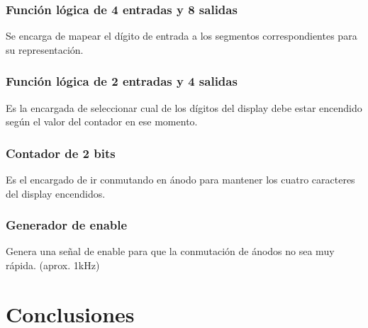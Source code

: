 \documentclass[a4paper,10pt]{article}
\begin{document}
		\subsubsection{Función lógica de 4 entradas y 8 salidas}
		Se encarga de mapear el dígito de entrada a los segmentos correspondientes para su representación.
		\subsubsection{Función lógica de 2 entradas y 4 salidas}
		Es la encargada de seleccionar cual de los dígitos del display debe estar encendido según el valor del contador en ese momento.
		\subsubsection{Contador de 2 bits}
		Es el encargado de ir conmutando en ánodo para mantener los cuatro caracteres del display encendidos.						\subsubsection{Generador de enable}
		Genera una señal de enable para que la conmutación de ánodos no sea muy rápida. (aprox. 1kHz)

\section{Conclusiones}
\end{document}
